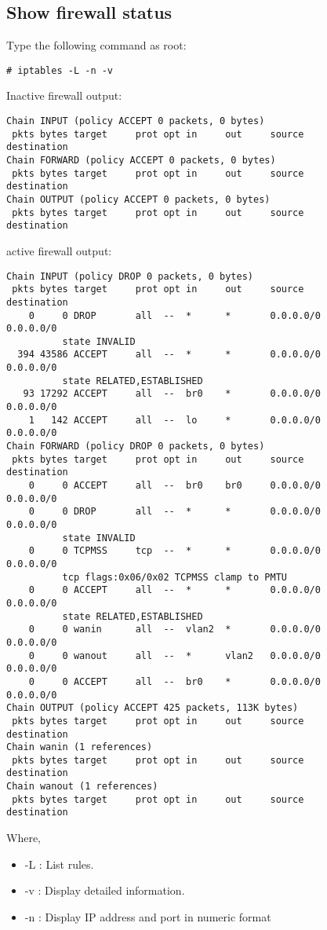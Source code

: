 \documentclass[dvipdfm]{book}
\begin{document}
\subsection{Show firewall status}

Type the following command as root:

\begin{verbatim}
# iptables -L -n -v
\end{verbatim}

Inactive firewall output:
\begin{verbatim}
Chain INPUT (policy ACCEPT 0 packets, 0 bytes)
 pkts bytes target     prot opt in     out     source               destination
Chain FORWARD (policy ACCEPT 0 packets, 0 bytes)
 pkts bytes target     prot opt in     out     source               destination
Chain OUTPUT (policy ACCEPT 0 packets, 0 bytes)
 pkts bytes target     prot opt in     out     source               destination
\end{verbatim}

active firewall output:
\begin{verbatim}
Chain INPUT (policy DROP 0 packets, 0 bytes)
 pkts bytes target     prot opt in     out     source               destination
    0     0 DROP       all  --  *      *       0.0.0.0/0            0.0.0.0/0 
          state INVALID
  394 43586 ACCEPT     all  --  *      *       0.0.0.0/0            0.0.0.0/0 
          state RELATED,ESTABLISHED
   93 17292 ACCEPT     all  --  br0    *       0.0.0.0/0            0.0.0.0/0
    1   142 ACCEPT     all  --  lo     *       0.0.0.0/0            0.0.0.0/0
Chain FORWARD (policy DROP 0 packets, 0 bytes)
 pkts bytes target     prot opt in     out     source               destination
    0     0 ACCEPT     all  --  br0    br0     0.0.0.0/0            0.0.0.0/0
    0     0 DROP       all  --  *      *       0.0.0.0/0            0.0.0.0/0 
          state INVALID
    0     0 TCPMSS     tcp  --  *      *       0.0.0.0/0            0.0.0.0/0 
          tcp flags:0x06/0x02 TCPMSS clamp to PMTU
    0     0 ACCEPT     all  --  *      *       0.0.0.0/0            0.0.0.0/0 
          state RELATED,ESTABLISHED
    0     0 wanin      all  --  vlan2  *       0.0.0.0/0            0.0.0.0/0
    0     0 wanout     all  --  *      vlan2   0.0.0.0/0            0.0.0.0/0
    0     0 ACCEPT     all  --  br0    *       0.0.0.0/0            0.0.0.0/0
Chain OUTPUT (policy ACCEPT 425 packets, 113K bytes)
 pkts bytes target     prot opt in     out     source               destination
Chain wanin (1 references)
 pkts bytes target     prot opt in     out     source               destination
Chain wanout (1 references)
 pkts bytes target     prot opt in     out     source               destination
\end{verbatim}
Where,
\begin{itemize}
\item -L : List rules.
\item -v : Display detailed information.
\item -n : Display IP address and port in numeric format
\end{itemize}
\end{document}
